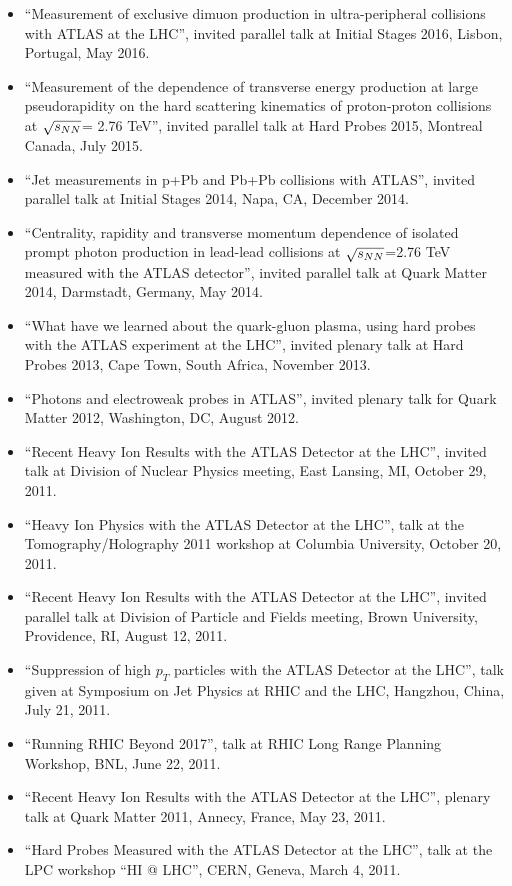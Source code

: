 \documentclass[11 pt]{article}
\begin{document}
\begin{description}
\begin{itemize}
\item ``Measurement of exclusive dimuon production in ultra-peripheral collisions with ATLAS at the LHC'', invited parallel talk at Initial Stages 2016, Lisbon, Portugal, May 2016.
\item ``Measurement of the dependence of transverse energy production at large pseudorapidity on the hard scattering kinematics of proton-proton collisions at $\sqrt{s_{NN}}$= 2.76 TeV'', invited parallel talk at Hard Probes 2015, Montreal Canada, July 2015.
\item ``Jet measurements in p+Pb and Pb+Pb collisions with ATLAS'', invited parallel talk at Initial Stages 2014, Napa, CA, December 2014.
\item ``Centrality, rapidity and transverse momentum dependence of isolated prompt photon production in lead-lead collisions at $\sqrt{s_{NN}}$=2.76 TeV measured with the ATLAS detector'', invited parallel talk at Quark Matter 2014, Darmstadt, Germany, May 2014.
\item ``What have we learned about the quark-gluon plasma, using hard probes with the ATLAS experiment at the LHC'', invited plenary talk at Hard Probes 2013, Cape Town, South Africa, November 2013.
\item ``Photons and electroweak probes in ATLAS'', invited plenary talk for Quark Matter 2012, Washington, DC, August 2012.
\item ``Recent Heavy Ion Results with the ATLAS Detector at the LHC'', invited talk at Division of Nuclear Physics meeting, East Lansing, MI, October 29, 2011.
\item ``Heavy Ion Physics with the ATLAS Detector at the LHC'', talk at the Tomography/Holography 2011 workshop at Columbia University, October 20, 2011.
\item ``Recent Heavy Ion Results with the ATLAS Detector at the LHC'', invited parallel talk at Division of Particle and Fields meeting, Brown University, Providence, RI, August 12, 2011.
\item ``Suppression of high $p_{T}$ particles with the ATLAS Detector at the LHC'', talk given at Symposium on Jet Physics at RHIC and the LHC, Hangzhou, China, July 21, 2011.
\item ``Running RHIC Beyond 2017'', talk at RHIC Long Range Planning Workshop, BNL, June 22, 2011.
\item ``Recent Heavy Ion Results with the ATLAS Detector at the LHC'', plenary talk at Quark Matter 2011, Annecy, France, May 23, 2011.
\item ``Hard Probes Measured with the ATLAS Detector at the LHC'', talk at the LPC workshop ``HI @ LHC'', CERN, Geneva, March 4, 2011.

\end{itemize}
\end{description}
\end{document}
